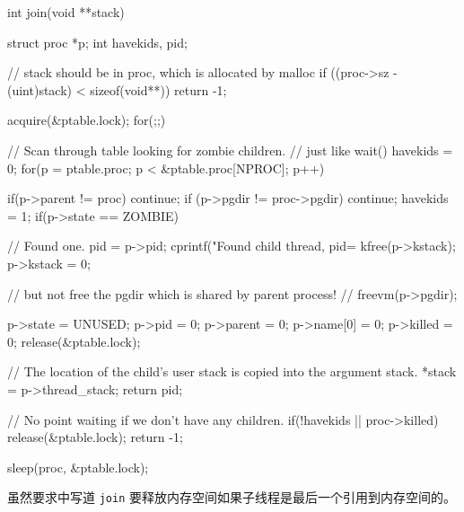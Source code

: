 \begin{ccode}
                    
    int
    join(void **stack) {
        struct proc *p;
        int havekids, pid;
                                
        // stack should be in proc, which is allocated by malloc
        if ((proc->sz - (uint)stack) < sizeof(void**))
        return -1;
                                
        acquire(&ptable.lock);
        for(;;){
            // Scan through table looking for zombie children.
            // just like wait()
            havekids = 0;
            for(p = ptable.proc; p < &ptable.proc[NPROC]; p++){
                if(p->parent != proc)
                continue;
                if (p->pgdir != proc->pgdir)
                continue;
                havekids = 1;
                if(p->state == ZOMBIE){
                    // Found one.
                    pid = p->pid; cprintf("Found child thread, pid=%
                    kfree(p->kstack);
                    p->kstack = 0;
                                                                                
                    // but not free the pgdir which is shared by parent process!
                    // freevm(p->pgdir);
                                                                                
                    p->state = UNUSED;
                    p->pid = 0;
                    p->parent = 0;
                    p->name[0] = 0;
                    p->killed = 0;
                    release(&ptable.lock);
                                                                                
                    // The location of the child's user stack is copied into the argument stack.
                    *stack = p->thread_stack;
                    return pid;
                }
            }
                                                
            // No point waiting if we don't have any children.
            if(!havekids || proc->killed){
                release(&ptable.lock);
                return -1;
            }
                                                
            sleep(proc, &ptable.lock);
        }
    }
\end{ccode}

虽然要求中写道 \texttt{join} 要释放内存空间如果子线程是最后一个引用到内存空间的。

